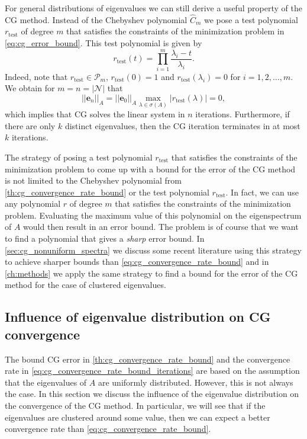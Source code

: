 For general distributions of eigenvalues we can still derive a useful property of the CG method. Instead of the Chebyshev polynomial $\hat{C}_m$ we pose a test polynomial $r_{\textrm{test}}$ of degree $m$ that satisfies the constraints of the minimization problem in \cref{eq:cg_error_bound}. This test polynomial is given by
\[
  r_{\textrm{test}}(t) = \prod_{i=1}^m \frac{\lambda_i - t}{\lambda_i}.
\]
Indeed, note that $r_{\textrm{test}}\in\mathcal{P}_m$, $r_{\textrm{test}}(0) = 1$ and $r_{\textrm{test}}(\lambda_i) = 0$ for $i = 1, 2, \dots, m$. We obtain for $m = n = |\mathcal{N}|$ that
\[
  ||\mathbf{e}_n||_A = ||\mathbf{e}_0||_A \max_{\lambda \in \sigma(A)} |r_{\textrm{test}}(\lambda)| = 0,
\]
which implies that CG solves the linear system in $n$ iterations. Furthermore, if there are only $k$ distinct eigenvalues, then the CG iteration terminates in at most $k$ iterations.

The strategy of posing a test polynomial $r_{\textrm{test}}$ that satisfies the constraints of the minimization problem to come up with a bound for the error of the CG method is not limited to the Chebyshev polynomial from \cref{th:cg_convergence_rate_bound} or the test polynomial $r_{\textrm{test}}$. In fact, we can use any polynomial $r$ of degree $m$ that satisfies the constraints of the minimization problem. Evaluating the maximum value of this polynomial on the eigenspectrum of $A$ would then result in an error bound. The problem is of course that we want to find a polynomial that gives a \textit{sharp} error bound. In \cref{sec:cg_nonuniform_spectra} we discuss some recent literature using this strategy to achieve sharper bounds than \cref{eq:cg_convergence_rate_bound} and in \cref{ch:methods} we apply the same strategy to find a bound for the error of the CG method for the case of clustered eigenvalues.

\subsection{Influence of eigenvalue distribution on CG convergence}\label{sec:cg_eigenvalue_distribution}
The bound CG error in \cref{th:cg_convergence_rate_bound} and the convergence rate in \cref{eq:cg_convergence_rate_bound_iterations} are based on the assumption that the eigenvalues of $A$ are uniformly distributed. However, this is not always the case. In this section we discuss the influence of the eigenvalue distribution on the convergence of the CG method. In particular, we will see that if the eigenvalues are clustered around some value, then we can expect a better convergence rate than \cref{eq:cg_convergence_rate_bound}.


